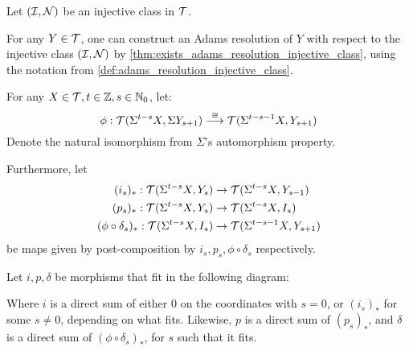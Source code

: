 \begin{construction} \label{construction:adams_spectral_sequence} 
    Let \( ({\mathcal{I}}, {\mathcal{N}}) \) be an injective class in \( {\mathcal{T}} \).

    For any \( Y \in {\mathcal{T}} \), one can construct an Adams resolution of \( Y \) with respect to the injective class \( ({\mathcal{I}}, {\mathcal{N}}) \) by \autoref{thm:exists_adams_resolution_injective_class}, using the notation from \autoref{def:adams_resolution_injective_class}.

    For any \( X \in {\mathcal{T}}, t \in {\mathbb{Z}}, s \in {\mathbb{N}}_0 \), let:
    \[ 
        \phi: {\mathcal{T}}(\Sigma^{t - s} X, \Sigma Y_{s + 1}) \stackrel{\cong}{\longrightarrow} {\mathcal{T}}(\Sigma^{t - s - 1} X, Y_{s + 1}) 
    \]
    Denote the natural isomorphism from \( \Sigma \)'s automorphism property.

    Furthermore, let
    \begin{align*}
        (i_s)_*: {\mathcal{T}}(\Sigma^{t - s} X, Y_s) &\to {\mathcal{T}}(\Sigma^{t - s} X, Y_{s - 1}) \\
        (p_s)_*: {\mathcal{T}}(\Sigma^{t - s} X, Y_s) &\to {\mathcal{T}}(\Sigma^{t - s} X, I_s) \\
        (\phi \circ \delta_s)_*: {\mathcal{T}}(\Sigma^{t - s} X, I_s) &\to {\mathcal{T}}(\Sigma^{t - s - 1} X, Y_{s + 1})
    \end{align*}
    be maps given by post-composition by \( i_s, p_s, \phi \circ \delta_s \) respectively.

    Let \( i, p, \delta \) be morphisms that fit in the following diagram:

    \begin{center}
    \end{center}

    Where \( i \) is a direct sum of either \( 0 \) on the coordinates with \( s = 0 \), or \( (i_s)_* \) for some \( s \neq 0 \), depending on what fits. Likewise, \( p \) is a direct sum of \( (p_s)_* \), and \( \delta \) is a direct sum of \( (\phi \circ \delta_s)_* \), for \( s \) such that it fits.
\end{construction}


